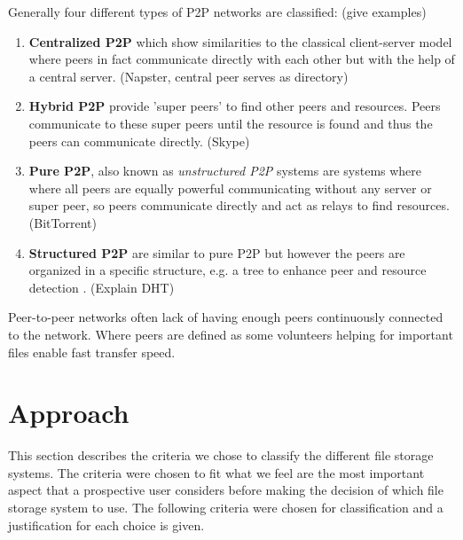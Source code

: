 Generally four different types of P2P networks are classified: (give examples)
\begin{enumerate}
	\item \textbf{Centralized P2P} which show similarities to the classical client-server model where peers in fact communicate directly with each other but with the help of a central server. (Napster, central peer serves as directory)
	\item \textbf{Hybrid P2P} provide 'super peers' to find other peers and resources. Peers communicate to these super peers until the resource is found and thus the peers can communicate directly. (Skype)
	\item \textbf{Pure P2P}, also known as \textit{unstructured P2P} systems are systems where where all peers are equally powerful communicating without any server or super peer, so peers communicate directly and act as relays to find resources. (BitTorrent)
	\item \textbf{Structured P2P} are similar to pure P2P but however the peers are organized in a specific structure, e.g. a tree to enhance peer and resource detection \cite{ptp-introduction:tomptp}. (Explain DHT)
\end{enumerate}

Peer-to-peer networks often lack of having enough peers continuously connected to the network. Where peers are defined as some volunteers helping for important files enable fast transfer speed.

\section{Approach} %
This section describes the criteria we chose to classify the different file storage systems. The criteria were chosen to fit what we feel are the most important aspect that a prospective user considers before making the decision of which file storage system to use. The following criteria were chosen for classification and a justification for each choice is given.

